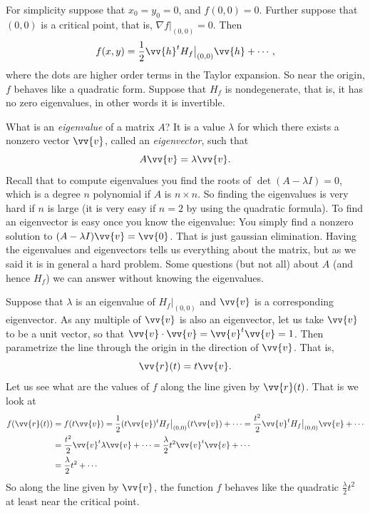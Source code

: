 \documentclass[12pt]{article}
\begin{document}
For simplicity suppose that $x_0 = y_0 = 0$, and $f(0,0) = 0$.
Further suppose that $(0,0)$ is a critical point, that is,
$\nabla f|_{(0,0)} = 0$.  Then
$$
f(x,y) = \frac{1}{2} \vv{h}^{t} H_f\big|_{(0,0)} \vv{h}
+
\cdots ,
$$
where the dots are higher order terms in the Taylor expansion.
So near the origin, $f$ behaves like a quadratic form.
Suppose that $H_f$ is nondegenerate, that is, it has
no zero eigenvalues, in other words it is invertible.

What is an \emph{eigenvalue} of a matrix $A$?
It is a value $\lambda$ for which there exists
a nonzero vector $\vv{v}$, called an \emph{eigenvector}, such that
\begin{equation*}
A \vv{v} = \lambda \vv{v} .
\end{equation*}
Recall that to compute eigenvalues you find the roots of $\det(A-\lambda I)
= 0$, which is a degree $n$ polynomial if $A$ is $n \times n$.  So finding
the eigenvalues is very hard if $n$ is large (it is very easy if $n=2$ by
using the quadratic formula).  To find an eigenvector is easy once you know
the eigenvalue: You simply find a nonzero solution to $(A-\lambda I) \vv{v}
= \vv{0}$.  That is just gaussian elimination.  Having the eigenvalues
and eigenvectors tells us everything about the matrix, but as we said
it is in general a hard problem.  Some questions (but not all)
about $A$ (and hence $H_f$) we can answer without knowing the eigenvalues.

Suppose that $\lambda$ is an eigenvalue of $H_f\big|_{(0,0)}$ and $\vv{v}$ is a
corresponding eigenvector.  As any multiple of $\vv{v}$ is also an
eigenvector, let us take $\vv{v}$ to be a unit vector,
so that $\vv{v} \cdot \vv{v} = \vv{v}^t \vv{v} = 1$.
Then parametrize the line through the origin in the direction
of $\vv{v}$.  That is,
\begin{equation*}
\vv{r}(t) = t\vv{v} .
\end{equation*}
Let us see what are the values of $f$ along the line given by
$\vv{r}(t)$.  That is we look at
\begin{equation*}
\begin{split}
f(\vv{r}(t)) & = 
f(t \vv{v}) = 
\frac{1}{2} (t \vv{v})^{t} H_f\big|_{(0,0)} (t \vv{v})
+
\cdots 
=
\frac{t^2}{2} \vv{v}^{t} H_f\big|_{(0,0)} \vv{v}
+
\cdots 
\\
& =
\frac{t^2}{2} \vv{v}^{t} \lambda \vv{v}
+
\cdots 
=
\frac{\lambda}{2} t^2 \vv{v}^{t} \vv{v}
+
\cdots 
\\
& =
\frac{\lambda}{2} t^2
+
\cdots 
\end{split}
\end{equation*}
So along the line given by $\vv{v}$, the function $f$ behaves like
the quadratic $\frac{\lambda}{2} t^2$ at least near the critical point.
\end{document}
